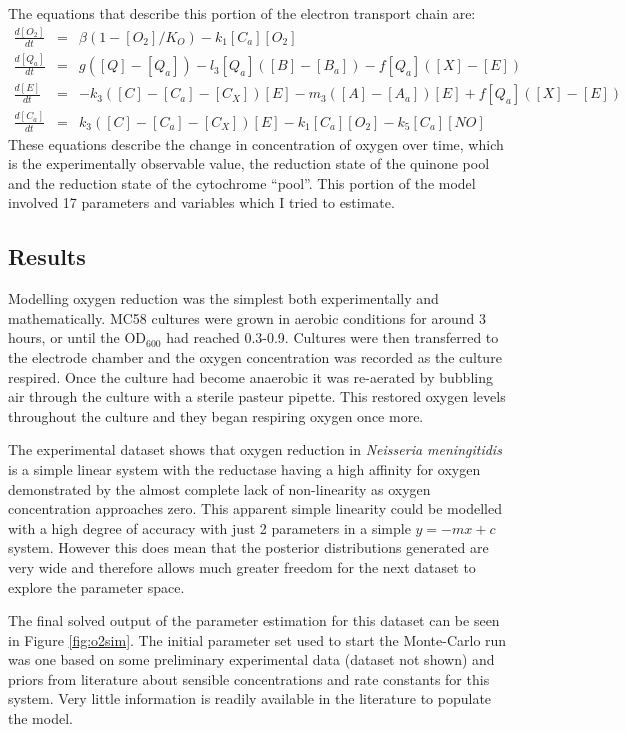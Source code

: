 The equations that describe this portion of the electron transport chain are:
\begin{eqnarray*}
\frac{d[O_2]}{dt} & = & \beta(1-[O_2]/K_O) - k_{1}[C_a][O_2]\\
\frac{d[Q_a]}{dt} & = & g([Q] - [Q_a]) - l_3[Q_a]([B] - [B_a]) - f[Q_a]([X]-[E])\\
\frac{d[E]}{dt} & = & -k_3([C] - [C_a] - [C_X])[E]  - m_3([A] - [A_a])[E] + f[Q_a]([X]-[E])\\
\frac{d[C_a]}{dt} & = & k_3([C] - [C_a] - [C_X])[E] - k_{1}[C_a][O_2] - k_5[C_a][NO]
\end{eqnarray*}
These equations describe the change in concentration of oxygen over time, which is the experimentally observable value, the reduction state of the quinone pool and the reduction state of the cytochrome ``pool''. This portion of the model involved 17 parameters and variables which I tried to estimate.

\subsection{Results}

Modelling oxygen reduction was the simplest both experimentally and mathematically. MC58 cultures were grown in aerobic conditions for around 3 hours, or until the $\mathrm{OD}_{600}$ had reached 0.3-0.9. Cultures were then transferred to the electrode chamber and the oxygen concentration was recorded as the culture respired. Once the culture had become anaerobic it was re-aerated by bubbling air through the culture with a sterile pasteur pipette. This  restored oxygen levels throughout the culture and they began respiring oxygen once more.


The experimental dataset shows that oxygen reduction in \textit{Neisseria meningitidis} is a simple linear system with the reductase having a high affinity for oxygen demonstrated by the almost complete lack of non-linearity as oxygen concentration approaches zero. This apparent simple linearity could be modelled with a high degree of accuracy with just 2 parameters in a simple $y=-mx+c$ system. However this does mean that the posterior distributions generated are very wide and therefore allows much greater freedom for the next dataset to explore the parameter space.

The final solved output of the parameter estimation for this dataset can be seen in Figure \ref{fig:o2sim}. The initial parameter set used to start the Monte-Carlo run was one based on some preliminary experimental data (dataset not shown) and priors from literature about sensible concentrations and rate constants for this system. Very little information is readily available in the literature to populate the model.

